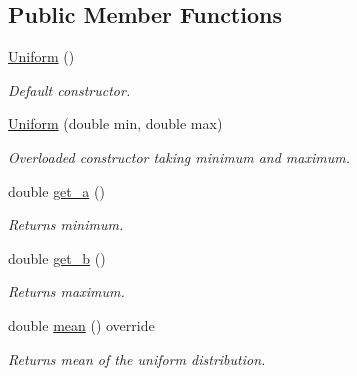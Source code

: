 \subsection*{Public Member Functions}
\begin{DoxyCompactItemize}
\item 
\mbox{\label{classUniform_a55d4df320842397431ce1b57c43924e8}} 
\hyperlink{classUniform_a55d4df320842397431ce1b57c43924e8}{Uniform} ()
\begin{DoxyCompactList}\small\item\em Default constructor. \end{DoxyCompactList}\item 
\mbox{\label{classUniform_a9c9a8915fe92ac802a55dd3875045a73}} 
\hyperlink{classUniform_a9c9a8915fe92ac802a55dd3875045a73}{Uniform} (double min, double max)
\begin{DoxyCompactList}\small\item\em Overloaded constructor taking minimum and maximum. \end{DoxyCompactList}\item 
\mbox{\label{classUniform_a82e17d9668c7a2463a533c8fea9b2222}} 
double \hyperlink{classUniform_a82e17d9668c7a2463a533c8fea9b2222}{get\+\_\+a} ()
\begin{DoxyCompactList}\small\item\em Returns minimum. \end{DoxyCompactList}\item 
\mbox{\label{classUniform_a7bd95be60e4243b9b7157fa4fa32f8d9}} 
double \hyperlink{classUniform_a7bd95be60e4243b9b7157fa4fa32f8d9}{get\+\_\+b} ()
\begin{DoxyCompactList}\small\item\em Returns maximum. \end{DoxyCompactList}\item 
\mbox{\label{classUniform_a8077a94f77038927e31eb962168dc8eb}} 
double \hyperlink{classUniform_a8077a94f77038927e31eb962168dc8eb}{mean} () override
\begin{DoxyCompactList}\small\item\em Returns mean of the uniform distribution. \end{DoxyCompactList}\item 

\end{DoxyCompactItemize}
